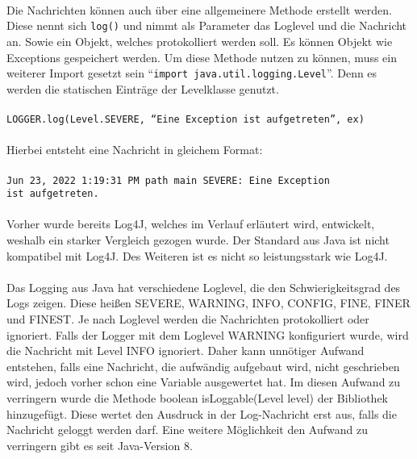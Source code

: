 {    \\
    \\
    \\
    Die Nachrichten können auch über eine allgemeinere Methode erstellt werden.
    Diese nennt sich \texttt{log()} und nimmt als Parameter das Loglevel und die Nachricht an.
    Sowie ein Objekt, welches protokolliert werden soll.
    Es können Objekt wie Exceptions gespeichert werden.
    Um diese Methode nutzen zu können, muss ein weiterer Import gesetzt sein \enquote{\texttt{import java.util.logging.Level}}.
    Denn es werden die statischen Einträge der Levelklasse genutzt.
    \\
    \\
    \hspace*{10mm}
    \texttt{LOGGER.log(Level.SEVERE, \enquote{Eine Exception ist aufgetreten}, ex)}
    \\
    \\
    Hierbei entsteht eine Nachricht in gleichem Format:
    \\
    \\
    \hspace*{10mm}
    \texttt{Jun 23, 2022 1:19:31 PM path main SEVERE: Eine Exception
    \\
    \hspace*{30mm} ist aufgetreten.}
    \\
    \\
    Vorher wurde bereits Log4J, welches im Verlauf erläutert wird, entwickelt, weshalb ein starker Vergleich gezogen wurde.
    Der Standard aus Java ist nicht kompatibel mit Log4J.
    Des Weiteren ist es nicht so leistungsstark wie Log4J.
    \\
    \\
    Das Logging aus Java hat verschiedene Loglevel, die den Schwierigkeitsgrad des Logs zeigen.
    Diese heißen SEVERE, WARNING, INFO, CONFIG, FINE, FINER und FINEST.
    Je nach Loglevel werden die Nachrichten protokolliert oder ignoriert.
    Falls der Logger mit dem Loglevel WARNING konfiguriert wurde, wird die Nachricht mit Level INFO ignoriert.
    Daher kann unnötiger Aufwand entstehen, falls eine Nachricht, die aufwändig aufgebaut wird, nicht geschrieben wird, jedoch vorher schon eine Variable ausgewertet hat.
    Im diesen Aufwand zu verringern wurde die Methode boolean isLoggable(Level level) der Bibliothek hinzugefügt.
    Diese wertet den Ausdruck in der Log-Nachricht erst aus, falls die Nachricht geloggt werden darf.
    Eine weitere Möglichkeit den Aufwand zu verringern gibt es seit Java-Version 8.
}

